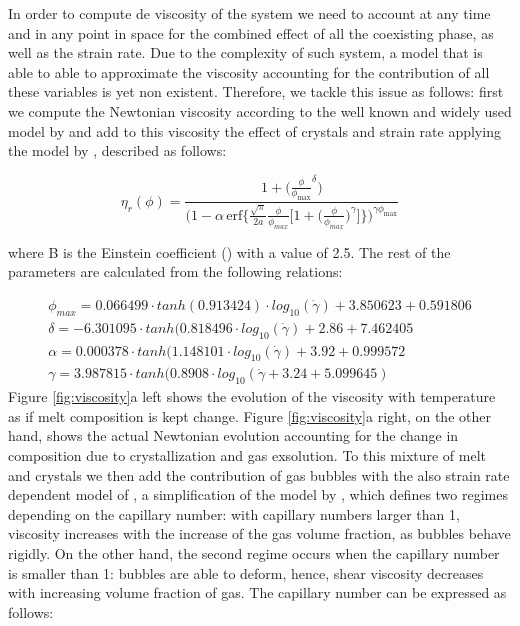 In order to compute de viscosity of the system we need to account at any time and in any point in space for the combined effect of all the coexisting phase, as well as the strain rate. Due to the complexity of such system, a model that is able to able to approximate the viscosity accounting for the contribution of all these variables is yet non existent. Therefore, we tackle this issue as follows: first we compute the Newtonian viscosity according to the well known and widely used model by \cite{giordano200} and add to this viscosity the effect of crystals and strain rate applying the model by \cite{caricchi2007}, described as follows:

\begin{equation}
	\eta_r(\phi) = \frac{1 + \big(\frac{\phi}{\phi_{\text{max}}}^{\delta}\big)}
	{\bigg(1 - \alpha \, \text{erf} \bigg\{ \frac{\sqrt{\pi}}{2a} \frac{\phi}{\phi_{max}}
		\bigg[ 1 + \bigg(\frac{\phi}{\phi_{max}}\bigg)^\gamma \bigg] \bigg\}\bigg)^{\gamma \phi_{\text{max}}}}
\end{equation}

where B is the Einstein coefficient (\cite{einstein1905}) with a value of 2.5. The rest of the parameters are calculated from the following relations:

\begin{equation}
	\begin{aligned}
		\phi_{max} = 0.066499·tanh(0.913424)·log_{10}(\dot{\gamma}) + 3.850623 + 0.591806 \\
		\delta =-6.301095·tanh(0.818496·log_{10}(\dot{\gamma}) + 2.86 + 7.462405 \\
		\alpha = 0.000378·tanh(1.148101·log_{10}(\dot{\gamma}) +3.92+0.999572 \\
		\gamma = 3.987815·tanh(0.8908·log_{10}(\dot{\gamma} + 3.24 + 5.099645)        
	\end{aligned}
\end{equation}
Figure \ref{fig:viscosity}a left shows the evolution of the viscosity with temperature as if melt composition is kept change. Figure \ref{fig:viscosity}a right, on the other hand, shows the actual Newtonian evolution accounting for the change in composition due to crystallization and gas exsolution. 
To this mixture of melt and crystals we then add the contribution of gas bubbles with the also strain rate dependent model of \cite{llewellin2005}, a simplification of the model by \cite{pal2003}, which defines two regimes depending on the capillary number: with capillary numbers larger than 1, viscosity increases with the increase of the gas volume fraction, as bubbles behave rigidly. On the other hand, the second regime occurs when the capillary number is smaller than 1: bubbles are able to deform, hence, shear viscosity decreases with increasing volume fraction of gas. The capillary number can be expressed as follows:


